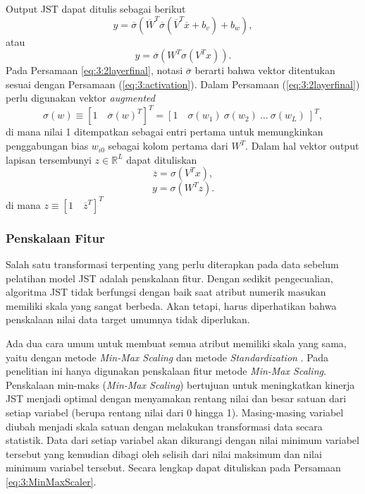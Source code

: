 \noindent Output JST dapat ditulis sebagai berikut
\begin{equation} \label{eq:3:2layer}
y = \overline{\sigma}
\left(
	\overline{W}^T\overline{\sigma}(\overline{V}^T\overline{x}+b_v)+b_w
\right),
\end{equation}
atau
\begin{equation} \label{eq:3:2layerfinal}
y = \overline{\sigma}
\left(
	W^T\sigma(V^Tx)
\right).
\end{equation}
Pada Persamaan \ref{eq:3:2layerfinal}, notasi $\overline{\sigma}$ berarti bahwa vektor ditentukan sesuai dengan Persamaan (\ref{eq:3:activation}). Dalam Persamaan (\ref{eq:3:2layerfinal}) perlu digunakan vektor \textit{augmented}
\begin{equation} \label{eq:3:augVector}
\sigma(w) \equiv [1\quad \overline{\sigma}(w)^T]^T = [1\quad \sigma(w_1)\ \sigma(w_2)\ \dots\ \sigma(w_L)\ ]^T,
\end{equation}
\noindent di mana nilai 1 ditempatkan sebagai entri pertama untuk memungkinkan penggabungan bias $w_{i0}$ sebagai kolom pertama dari $W^T$. Dalam hal vektor output lapisan tersembunyi $z\in \mathbb{R}^L$ dapat dituliskan
\begin{equation} \label{eq:3:final19}
\overline{z} = \sigma(V^Tx),
\end{equation}
\begin{equation} \label{eq:3:final20}
y = \sigma(W^Tz).
\end{equation}
\noindent di mana $z \equiv [1\quad \overline{z}^T]^T$

\subsubsection{Penskalaan Fitur}

Salah satu transformasi terpenting yang perlu diterapkan pada data sebelum pelatihan model JST adalah penskalaan fitur. Dengan sedikit pengecualian, algoritma JST tidak berfungsi dengan baik saat atribut numerik masukan memiliki skala yang sangat berbeda. Akan tetapi, harus diperhatikan bahwa penskalaan nilai data target umumnya tidak diperlukan.

Ada dua cara umum untuk membuat semua atribut memiliki skala yang sama, yaitu dengan metode \textit{Min-Max Scaling} dan metode \textit{Standardization} \cite{HandsOnML}. Pada penelitian ini hanya digunakan penskalaan fitur metode \textit{Min-Max Scaling}. Penskalaan min-maks (\textit{Min-Max Scaling}) bertujuan untuk meningkatkan kinerja JST menjadi optimal dengan menyamakan rentang nilai dan besar satuan dari setiap variabel (berupa rentang nilai dari 0 hingga 1). Masing-masing variabel diubah menjadi skala satuan dengan melakukan transformasi data secara statistik. Data dari setiap variabel akan dikurangi dengan nilai minimum variabel tersebut yang kemudian dibagi oleh selisih dari nilai maksimum dan nilai minimum variabel tersebut. Secara lengkap dapat dituliskan pada Persamaan \ref{eq:3:MinMaxScaler}.


